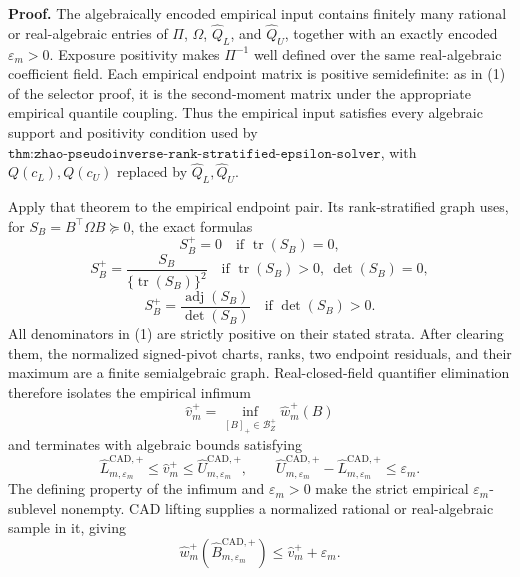 \textbf{Proof.}
The algebraically encoded empirical input contains finitely many rational or real-algebraic entries of \(\Pi\), \(\Omega\), \(\widehat Q_L\), and \(\widehat Q_U\), together with an exactly encoded \(\varepsilon_m>0\).  Exposure positivity makes \(\Pi^{-1}\) well defined over the same real-algebraic coefficient field.  Each empirical endpoint matrix is positive semidefinite: as in (1) of the selector proof, it is the second-moment matrix under the appropriate empirical quantile coupling.  Thus the empirical input satisfies every algebraic support and positivity condition used by \(\texttt{thm:zhao-pseudoinverse-rank-stratified-epsilon-solver}\), with \(Q(c_L),Q(c_U)\) replaced by \(\widehat Q_L,\widehat Q_U\).

Apply that theorem to the empirical endpoint pair.  Its rank-stratified graph uses, for \(S_B=B^{\top}\Omega B\succeq0\), the exact formulas
\[
S_B^+=0\quad\text{if }\operatorname{tr}(S_B)=0,
\]
\[
S_B^+=\frac{S_B}{\{\operatorname{tr}(S_B)\}^2}
\quad\text{if }\operatorname{tr}(S_B)>0,\ \det(S_B)=0,
\]
\[
S_B^+=\frac{\operatorname{adj}(S_B)}{\det(S_B)}
\quad\text{if }\det(S_B)>0.
\tag{1}
\]
All denominators in (1) are strictly positive on their stated strata.  After clearing them, the normalized signed-pivot charts, ranks, two endpoint residuals, and their maximum are a finite semialgebraic graph.  Real-closed-field quantifier elimination therefore isolates the empirical infimum
\[
\widehat v_m^+=\inf_{[B]_+\in\mathcal B_Z^+}\widehat w_m^+(B)
\]
and terminates with algebraic bounds satisfying
\[
\widehat L_{m,\varepsilon_m}^{\mathrm{CAD},+}
\le\widehat v_m^+
\le\widehat U_{m,\varepsilon_m}^{\mathrm{CAD},+},
\qquad
\widehat U_{m,\varepsilon_m}^{\mathrm{CAD},+}
-\widehat L_{m,\varepsilon_m}^{\mathrm{CAD},+}\le\varepsilon_m.
\tag{2}
\]
The defining property of the infimum and \(\varepsilon_m>0\) make the strict empirical \(\varepsilon_m\)-sublevel nonempty.  CAD lifting supplies a normalized rational or real-algebraic sample in it, giving
\[
\widehat w_m^+(\widehat B_{m,\varepsilon_m}^{\mathrm{CAD},+})
\le\widehat v_m^++\varepsilon_m.
\tag{3}
\]

